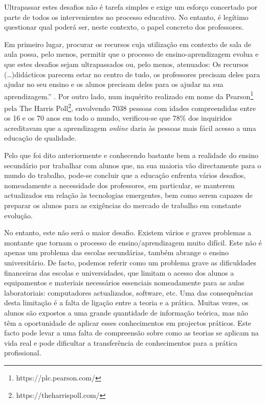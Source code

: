 Ultrapassar estes desafios não é tarefa simples e exige um esforço concertado por parte de todos os intervenientes no processo educativo. No entanto, é legítimo questionar qual poderá ser, neste contexto, o papel concreto dos professores.

Em primeiro lugar, procurar os recursos cuja utilização em contexto de sala de aula possa, pelo menos, permitir que o processo de ensino-aprendizagem evolua e que estes desafios sejam ultrapassados ou, pelo menos, atenuados: Os recursos (\ldots)didácticos parecem estar no centro de tudo, os professores precisam deles para ajudar no seu ensino e os alunos precisam deles para os ajudar na sua aprendizagem.'' \cite{virtuallabng}. Por outro lado, num inquérito \cite{pearson} realizado em nome da Pearson\footnote{https://plc.pearson.com/} pela The Harris Poll\footnote{https://theharrispoll.com/}, envolvendo 7038 pessoas com idades compreendidas entre os 16 e os 70 anos em todo o mundo, verificou-se que 78\% dos inquiridos acreditavam que a aprendizagem \textit{online} daria às pessoas mais fácil acesso a uma educação de qualidade. 

Pelo que foi dito anteriormente e conhecendo bastante bem a realidade do ensino secundário por trabalhar com alunos que, na sua maioria vão directamente para o mundo do trabalho, pode-se concluir que a educação enfrenta vários desafios, nomeadamente a necessidade dos professores, em particular, se manterem actualizados em relação às tecnologias emergentes, bem como serem capazes de preparar os alunos para as exigências do mercado de trabalho em constante evolução.

No entanto, este não será o maior desafio. Existem vários e graves problemas a montante que tornam o processo de ensino/aprendizagem muito difícil. Este não é apenas um problema das escolas secundárias, também abrange o ensino universitário. De facto, podemos referir como um problema grave as dificuldades financeiras \cite{dificuldadesfinanciamento, Financiamentoprofissional, Educacaofinanciamento} das escolas e universidades, que limitam o acesso dos alunos a equipamentos e materiais necessários essenciais nomeadamente para as aulas laboratoriais: computadores actualizados, software, etc. Uma das consequências desta limitação é a falta de ligação entre a teoria e a prática. Muitas vezes, os alunos são expostos a uma grande quantidade de informação teórica, mas não têm a oportunidade de aplicar esses conhecimentos em projectos práticos. Este facto pode levar a uma falta de compreensão sobre como as teorias se aplicam na vida real e pode dificultar a transferência de conhecimentos para a prática profissional.

